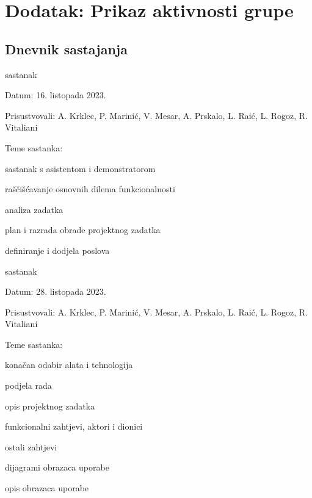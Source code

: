 \chapter*{Dodatak: Prikaz aktivnosti grupe}

\section*{Dnevnik sastajanja}

\begin{packed_enum}
	\item  sastanak
	
	\item[] \begin{packed_item}
		\item Datum: 16. listopada 2023.
		\item Prisustvovali: A. Krklec, P. Marinić, V. Mesar, A. Prskalo, L. Raić, L. Rogoz, R. Vitaliani
		\item Teme sastanka:
		\begin{packed_item}
			\item sastanak s asistentom i demonstratorom
			\item raščišćavanje osnovnih dilema funkcionalnosti
			\item analiza zadatka
			\item plan i razrada obrade projektnog zadatka
			\item definiranje i dodjela poslova
		\end{packed_item}
	\end{packed_item}
	
	\item  sastanak
	\item[] \begin{packed_item}
		\item Datum: 28. listopada 2023.
		\item Prisustvovali: A. Krklec, P. Marinić, V. Mesar, A. Prskalo, L. Raić, L. Rogoz, R. Vitaliani
		\item Teme sastanka:
		\begin{packed_item}
			\item konačan odabir alata i tehnologija
			\item podjela rada
			\item opis projektnog zadatka
			\item funkcionalni zahtjevi, aktori i dionici
			\item ostali zahtjevi
			\item dijagrami obrazaca uporabe
			\item opis obrazaca uporabe
		\end{packed_item}
	\end{packed_item}
	

\end{packed_enum}
